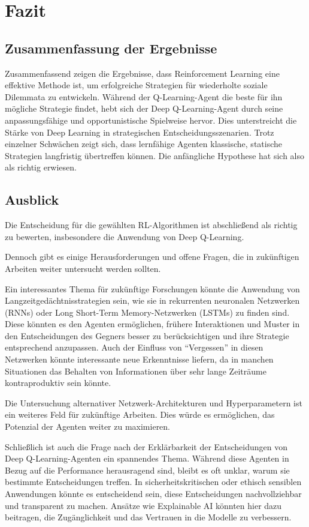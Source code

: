 \chapter{Fazit}
\section{Zusammenfassung der Ergebnisse}
Zusammenfassend zeigen die Ergebnisse, dass Reinforcement Learning eine effektive Methode ist, um erfolgreiche Strategien für wiederholte 
soziale Dilemmata zu entwickeln. Während der Q-Learning-Agent die beste für ihn mögliche Strategie findet, hebt sich der Deep Q-Learning-Agent 
durch seine anpassungsfähige und opportunistische Spielweise hervor. Dies unterstreicht die Stärke von Deep Learning in strategischen 
Entscheidungsszenarien. Trotz einzelner Schwächen zeigt sich, dass lernfähige Agenten klassische, statische Strategien langfristig übertreffen können.
Die anfängliche Hypothese hat sich also als richtig erwiesen.

\section{Ausblick}
Die Entscheidung für die gewählten RL-Algorithmen ist abschließend als richtig zu bewerten, insbesondere die Anwendung von Deep Q-Learning.

Dennoch gibt es einige Herausforderungen und 
offene Fragen, die in zukünftigen Arbeiten weiter untersucht werden sollten.

Ein interessantes Thema für zukünftige Forschungen könnte die Anwendung von Langzeitgedächtnisstrategien sein, 
wie sie in rekurrenten neuronalen Netzwerken (RNNs) oder Long Short-Term Memory-Netzwerken (LSTMs) zu finden sind. 
Diese könnten es den Agenten ermöglichen, frühere Interaktionen und Muster in den Entscheidungen des Gegners besser zu berücksichtigen 
und ihre Strategie entsprechend anzupassen. Auch der Einfluss von ``Vergessen'' in diesen Netzwerken könnte interessante neue 
Erkenntnisse liefern, da in manchen Situationen das Behalten von Informationen über sehr lange Zeiträume kontraproduktiv sein könnte.

Die Untersuchung alternativer Netzwerk-Architekturen und Hyperparametern ist ein weiteres Feld für zukünftige Arbeiten. 
Dies würde es ermöglichen, das Potenzial der Agenten weiter zu maximieren.

Schließlich ist auch die Frage nach der Erklärbarkeit der Entscheidungen von Deep Q-Learning-Agenten ein spannendes Thema. 
Während diese Agenten in Bezug auf die Performance herausragend sind, bleibt es oft unklar, warum sie bestimmte Entscheidungen treffen. 
In sicherheitskritischen oder ethisch sensiblen Anwendungen könnte es entscheidend sein, diese Entscheidungen nachvollziehbar 
und transparent zu machen. Ansätze wie Explainable AI könnten hier dazu beitragen, die Zugänglichkeit und das 
Vertrauen in die Modelle zu verbessern.

